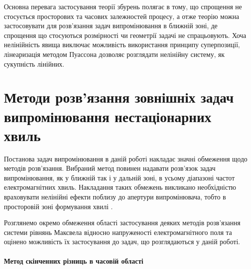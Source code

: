 Основна перевага застосування теорії збурень полягає в тому, що спрощення
не стосується просторових та часових залежностей процесу, а отже теорію можна 
застосовувати для розв'язання задач випромінювання в ближній зоні, де 
спрощення що стосуються розмірності чи геометрії задачі не спрацьовують.
Хоча нелінійність явища виключає можливість використання принципу 
суперпозиції, лінеаризація методом Пуассона дозволяє розглядати нелінійну 
систему, як сукупність лінійних. 

\section{Методи розв'язання зовнішніх задач випромінювання нестаціонарних хвиль}


Постанова задач випромінювання в даній роботі накладає значні обмеження щодо 
методів розв'язання. Вибраний метод повинен надавати розв'язок задач 
випромінювання, як у ближній так і у дальній зоні, в усьому діапазоні 
частот електромагнітних хвиль. Накладання таких обмежень викликано
необхідністю враховувати нелінійні ефекти поблизу до апертури випромінювача, 
тобто в просторовій зоні формування хвилі \cite{imp:BaumUWBSP1}.



Розглянемо окремо обмеження області застосування деяких методів 
розв'язання системи рівнянь Максвела відносно напруженості 
електромагнітного поля та оцінено можливість їх застосування до задач, 
що розглядаються у даній роботі.

\paragraph{Метод скінченних різниць в часовій області}

